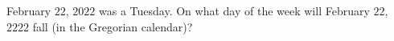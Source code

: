 February $22$, $2022$ was a Tuesday. On what day of the week will February $22$, $2222$ fall (in the Gregorian calendar)?

